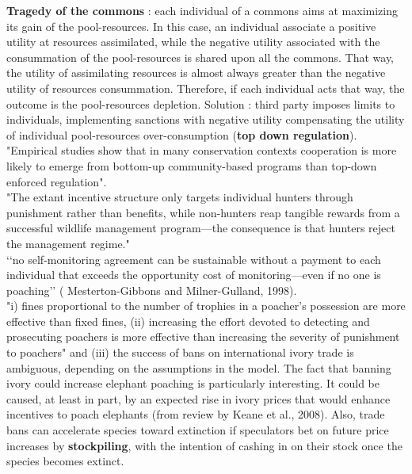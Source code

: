 \documentclass[12pt]{article}
\begin{document}
\textbf{Tragedy of the commons} : each individual of a commons aims at maximizing its gain of the pool-resources. In this case, an individual associate a positive utility at resources assimilated, while the negative utility associated with the consummation of the pool-resources is shared upon all the commons. That way, the utility of assimilating resources is almost always greater than the negative utility of resources consummation. Therefore, if each individual acts that way, the outcome is the pool-resources depletion. Solution : third party imposes limits to individuals, implementing sanctions with negative utility compensating the utility of individual pool-resources over-consumption (\textbf{top down regulation}).\\
"Empirical studies show that in many conservation contexts
cooperation is more likely to emerge from bottom-up community-based programs than top-down enforced regulation".\\
"The extant incentive structure only targets individual hunters
through punishment rather than benefits, while non-hunters reap
tangible rewards from a successful wildlife management program—the consequence is that hunters reject the management regime."\\
‘‘no self-monitoring agreement can be sustainable without a payment to each individual that exceeds the opportunity cost of monitoring—even if no one is poaching’’ (
Mesterton-Gibbons and
Milner-Gulland, 1998).\\
"i) fines proportional to the number of trophies in a poacher’s
possession are more effective than fixed fines, (ii) increasing the effort devoted to detecting and prosecuting poachers is more effective than increasing the severity of punishment to poachers" and (iii) the success of bans on international ivory trade is ambiguous, depending on the assumptions in
the model. The fact that banning ivory could increase elephant
poaching is particularly interesting. It could be caused, at least in
part, by an expected rise in ivory prices that would enhance incentives to poach elephants (from review by Keane et al., 2008). Also, trade bans can accelerate species toward
extinction if speculators bet on future price increases by \textbf{stockpiling}, with the intention of cashing in on their stock once the species
becomes extinct.\\
\end{document}
